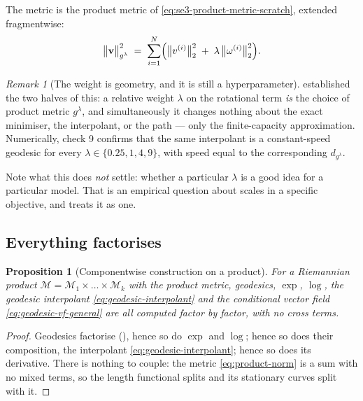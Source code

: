 \documentclass[11pt,a4paper]{report}
\newtheorem{proposition}[proposition]{Proposition}
\theoremstyle{definition}
\theoremstyle{remark}
\newtheorem{remark}[remark]{Remark}
\begin{document}
The metric is the product metric of \eqref{eq:se3-product-metric-scratch},
extended fragmentwise:
\begin{equation}
\label{eq:product-norm}
\bigl\|\mathbf v\bigr\|_{g^\lambda}^2
\;=\;
\sum_{i=1}^N\Bigl(\bigl\|v^{(i)}\bigr\|_2^2 \;+\; \lambda\,\bigl\|\omega^{(i)}\bigr\|_2^2\Bigr) .
\end{equation}

\begin{remark}[The weight is geometry, and it is still a hyperparameter]
\label{rem:product-lambda-rfm}
 established the two halves of this: a relative
weight $\lambda$ on the rotational term \emph{is} the choice of product
metric $g^\lambda$, and simultaneously it changes nothing about the exact
minimiser, the interpolant, or the path --- only the finite-capacity
approximation. Numerically,  check 9 confirms that
the same interpolant is a constant-speed geodesic for every
$\lambda\in\{0.25,1,4,9\}$, with speed equal to the corresponding
$d_{g^\lambda}$.

Note what this does \emph{not} settle: whether a particular $\lambda$ is a
good idea for a particular model. That is an empirical question about scales
in a specific objective, and  treats it as one.
\end{remark}

\subsection{Everything factorises}

\begin{proposition}[Componentwise construction on a product]
\label{prop:rfm-product}
For a Riemannian product $\mathcal M=\mathcal M_1\times\dots\times\mathcal M_k$
with the product metric, geodesics, $\exp$, $\log$, the geodesic interpolant
\eqref{eq:geodesic-interpolant} and the conditional vector field
\eqref{eq:geodesic-vf-general} are all computed factor by factor, with no
cross terms.
\end{proposition}

\begin{proof}
Geodesics factorise (), hence so do $\exp$ and
$\log$; hence so does their composition, the interpolant
\eqref{eq:geodesic-interpolant}; hence so
does its derivative. There is nothing to couple: the metric
\eqref{eq:product-norm} is a sum with no mixed terms, so the length
functional splits and its stationary curves split with it.
\end{proof}
\end{document}
